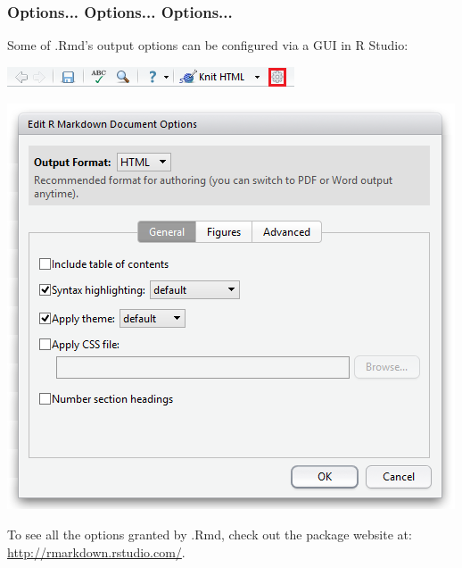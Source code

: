 \documentclass{beamer}\usepackage[]{graphicx}\usepackage[]{color}
\begin{document}
\begin{frame}
\frametitle{Options... Options... Options...}
Some of .Rmd's output options can be configured via a GUI in R Studio:
\begin{center}
\includegraphics[scale=0.5]{img/rmd/rmd_options.png}
\end{center}
\begin{center}
\includegraphics[scale=0.35]{img/rmd/rmd_options_in_rstudio.png}
\end{center}

To see all the options granted by .Rmd, check out the package website at:
\url{http://rmarkdown.rstudio.com/}. 
\end{frame}
\end{document}
